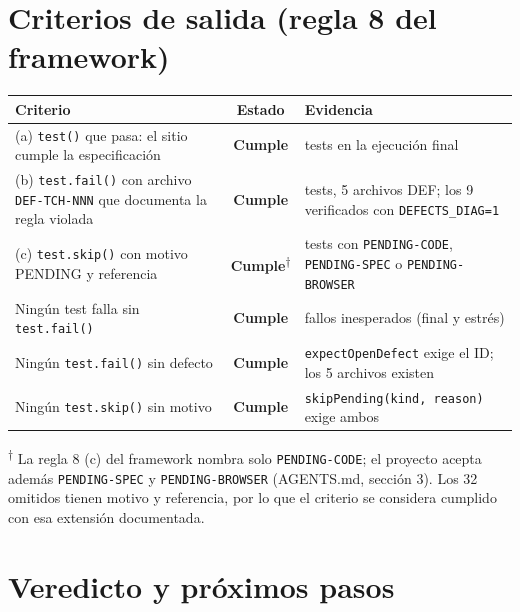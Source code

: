\documentclass[11pt,a4paper]{article}
\newcommand{\code}[1]{\texttt{#1}}
\begin{document}
\section{Criterios de salida (regla 8 del framework)}

\begin{center}\small
\begin{tabularx}{\textwidth}{@{}>{\raggedright\arraybackslash}X c >{\raggedright\arraybackslash}p{}@{}}
\toprule
Criterio & Estado & Evidencia \\
\midrule
(a) \code{test()} que pasa: el sitio cumple la especificación & \textcolor{secondary}{\bfseries Cumple} & 78 tests en la ejecución final \\
(b) \code{test.fail()} con archivo \code{DEF-TCH-NNN} que documenta la regla violada & \textcolor{secondary}{\bfseries Cumple} & 9 tests, 5 archivos DEF; los 9 verificados con \code{DEFECTS\_DIAG=1} \\
(c) \code{test.skip()} con motivo PENDING y referencia & \textcolor{secondary}{\bfseries Cumple}\textsuperscript{†} & 32 tests con \code{PENDING-CODE}, \code{PENDING-SPEC} o \code{PENDING-BROWSER} \\
Ningún test falla sin \code{test.fail()} & \textcolor{secondary}{\bfseries Cumple} & 0 fallos inesperados (final y estrés) \\
Ningún \code{test.fail()} sin defecto & \textcolor{secondary}{\bfseries Cumple} & \code{expectOpenDefect} exige el ID; los 5 archivos existen \\
Ningún \code{test.skip()} sin motivo & \textcolor{secondary}{\bfseries Cumple} & \code{skipPending(kind, reason)} exige ambos \\
\bottomrule
\end{tabularx}
\end{center}

{\footnotesize\raggedright\color{muted}\textsuperscript{†} La regla 8 (c) del framework nombra solo \code{PENDING-CODE}; el proyecto acepta además \code{PENDING-SPEC} y \code{PENDING-BROWSER} (AGENTS.md, sección 3). Los 32 omitidos tienen motivo y referencia, por lo que el criterio se considera cumplido con esa extensión documentada.\par}

\section{Veredicto y próximos pasos}
\end{document}
